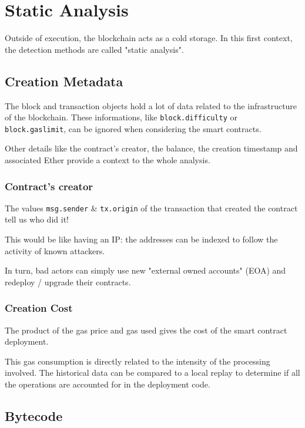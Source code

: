 \section{Static Analysis} \label{sec:data-static}

Outside of execution, the blockchain acts as a cold storage.
In this first context, the detection methods are called "static analysis".

\subsection{Creation Metadata}

The block and transaction objects hold a lot of data related to the infrastructure of the blockchain.
These informations, like \lstinline[language=Solidity]{block.difficulty} or \lstinline[language=Solidity]{block.gaslimit}, can be ignored when considering the smart contracts.

Other details like the contract's creator, the balance, the creation timestamp and associated Ether provide a context to the whole analysis.

\subsubsection{Contract's creator}

The values \lstinline[language=Solidity]{msg.sender} \& \lstinline[language=Solidity]{tx.origin} of the transaction that created the contract tell us who did it!

This would be like having an IP: the addresses can be indexed to follow the activity of known attackers.

In turn, bad actors can simply use new "external owned accounts" (EOA) and redeploy / upgrade their contracts.

\subsubsection{Creation Cost}

The product of the gas price and gas used gives the cost of the smart contract deployment.

This gas consumption is directly related to the intensity of the processing involved.
The historical data can be compared to a local replay to determine if all the operations are accounted for in the deployment code.

\subsection{Bytecode}

